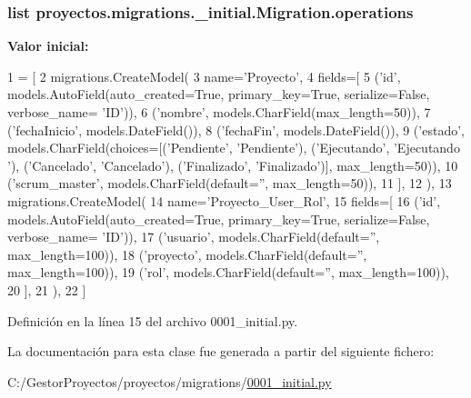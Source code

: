 \subsubsection[{\texorpdfstring{operations}{operations}}]{\setlength{\rightskip}{0pt plus 5cm}list proyectos.\+migrations.\+\_\+initial.\+Migration.\+operations\hspace{0.3cm}{\ttfamily [static]}}\hypertarget{classproyectos_1_1migrations_1_10001__initial_1_1_migration_a4f85977f400ac7fd376b6f738c1d87bf}{}\label{classproyectos_1_1migrations_1_10001__initial_1_1_migration_a4f85977f400ac7fd376b6f738c1d87bf}
{\bfseries Valor inicial\+:}
\begin{DoxyCode}
1 = [
2         migrations.CreateModel(
3             name=\textcolor{stringliteral}{'Proyecto'},
4             fields=[
5                 (\textcolor{stringliteral}{'id'}, models.AutoField(auto\_created=\textcolor{keyword}{True}, primary\_key=\textcolor{keyword}{True}, serialize=\textcolor{keyword}{False}, verbose\_name=\textcolor{stringliteral}{
      'ID'})),
6                 (\textcolor{stringliteral}{'nombre'}, models.CharField(max\_length=50)),
7                 (\textcolor{stringliteral}{'fechaInicio'}, models.DateField()),
8                 (\textcolor{stringliteral}{'fechaFin'}, models.DateField()),
9                 (\textcolor{stringliteral}{'estado'}, models.CharField(choices=[(\textcolor{stringliteral}{'Pendiente'}, \textcolor{stringliteral}{'Pendiente'}), (\textcolor{stringliteral}{'Ejecutando'}, \textcolor{stringliteral}{'Ejecutando
      '}), (\textcolor{stringliteral}{'Cancelado'}, \textcolor{stringliteral}{'Cancelado'}), (\textcolor{stringliteral}{'Finalizado'}, \textcolor{stringliteral}{'Finalizado'})], max\_length=50)),
10                 (\textcolor{stringliteral}{'scrum\_master'}, models.CharField(default=\textcolor{stringliteral}{''}, max\_length=50)),
11             ],
12         ),
13         migrations.CreateModel(
14             name=\textcolor{stringliteral}{'Proyecto\_User\_Rol'},
15             fields=[
16                 (\textcolor{stringliteral}{'id'}, models.AutoField(auto\_created=\textcolor{keyword}{True}, primary\_key=\textcolor{keyword}{True}, serialize=\textcolor{keyword}{False}, verbose\_name=\textcolor{stringliteral}{
      'ID'})),
17                 (\textcolor{stringliteral}{'usuario'}, models.CharField(default=\textcolor{stringliteral}{''}, max\_length=100)),
18                 (\textcolor{stringliteral}{'proyecto'}, models.CharField(default=\textcolor{stringliteral}{''}, max\_length=100)),
19                 (\textcolor{stringliteral}{'rol'}, models.CharField(default=\textcolor{stringliteral}{''}, max\_length=100)),
20             ],
21         ),
22     ]
\end{DoxyCode}


Definición en la línea 15 del archivo 0001\+\_\+initial.\+py.



La documentación para esta clase fue generada a partir del siguiente fichero\+:\begin{DoxyCompactItemize}
\item 
C\+:/\+Gestor\+Proyectos/proyectos/migrations/\hyperlink{proyectos_2migrations_20001__initial_8py}{0001\+\_\+initial.\+py}\end{DoxyCompactItemize}

